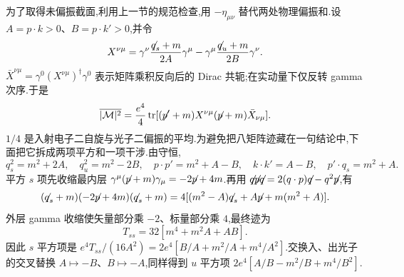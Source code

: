 为了取得未偏振截面,利用上一节的规范检查,用 $-\eta_{\mu\nu}$ 替代两处物理偏振和.设 $A=p\cdot k>0$、$B=p\cdot k'>0$,并令
\begin{equation}
 X^{\nu\mu}=\gamma^\nu\frac{\slashed q_s+m}{2A}\gamma^\mu
 -\gamma^\mu\frac{\slashed q_u+m}{2B}\gamma^\nu.
\end{equation}
$\bar X^{\nu\mu}=\gamma^0(X^{\nu\mu})^\dagger\gamma^0$ 表示矩阵乘积反向后的 Dirac 共轭;在实动量下仅反转 gamma 次序.于是
\begin{equation}
 \overline{|\mathcal M|^2}=\frac{e^4}{4}
 \tr[(\slashed p'+m)X^{\nu\mu}(\slashed p+m)\bar X_{\nu\mu}].
 \label{eq:compton-trace}
\end{equation}
$1/4$ 是入射电子二自旋与光子二偏振的平均.为避免把八矩阵迹藏在一句结论中,下面把它拆成两项平方和一项干涉.由守恒,
\begin{equation}
 q_s^2=m^2+2A,\quad q_u^2=m^2-2B,
 \quad p\cdot p'=m^2+A-B,\quad k\cdot k'=A-B,
 \quad p'\cdot q_s=m^2+A.
\end{equation}
平方 $s$ 项先收缩最内层 $\gamma^\mu(\slashed p+m)\gamma_\mu=-2\slashed p+4m$.再用
$\slashed q\slashed p\slashed q=2(q\cdot p)\slashed q-q^2\slashed p$,有
\begin{equation}
 (\slashed q_s+m)(-2\slashed p+4m)(\slashed q_s+m)
 =4[(m^2-A)\slashed q_s+A\slashed p+m(m^2+A)].
\end{equation}
外层 gamma 收缩使矢量部分乘 $-2$、标量部分乘 $4$,最终迹为
\begin{equation}
 T_{ss}=32[m^4+m^2A+AB].
\end{equation}
因此 $s$ 平方项是 $e^4T_{ss}/(16A^2)=2e^4[B/A+m^2/A+m^4/A^2]$.交换入、出光子的交叉替换 $A\mapsto-B$、$B\mapsto-A$,同样得到 $u$ 平方项 $2e^4[A/B-m^2/B+m^4/B^2]$.

